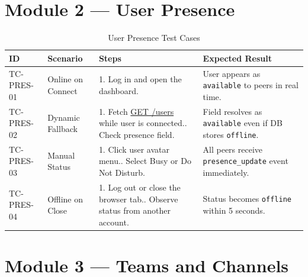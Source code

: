 \documentclass[11pt,a4paper]{report}
\begin{document}
\clearpage

\section{Module 2 --- User Presence}

\begin{xltabular}{\textwidth}{|L{2.5cm}|L{2.5cm}|X|L{3.5cm}|}
\caption{User Presence Test Cases} \\
\hline
{} \textbf{ID} & \textbf{Scenario} & \textbf{Steps} & \textbf{Expected Result} \\ \hline
\endhead

TC-PRES-01 & Online on Connect &
1. Log in and open the dashboard. &
User appears as \texttt{available} to peers in real time. \\ \hline

TC-PRES-02 & Dynamic Fallback &
1. Fetch \url{GET /users} while user is connected.. Check presence field. &
Field resolves as \texttt{available} even if DB stores \texttt{offline}. \\ \hline

TC-PRES-03 & Manual Status &
1. Click user avatar menu.. Select Busy or Do Not Disturb. &
All peers receive \texttt{presence\_update} event immediately. \\ \hline

TC-PRES-04 & Offline on Close &
1. Log out or close the browser tab.. Observe status from another account. &
Status becomes \texttt{offline} within 5 seconds. \\ \hline
\end{xltabular}

\clearpage

\section{Module 3 --- Teams and Channels}
\end{document}
